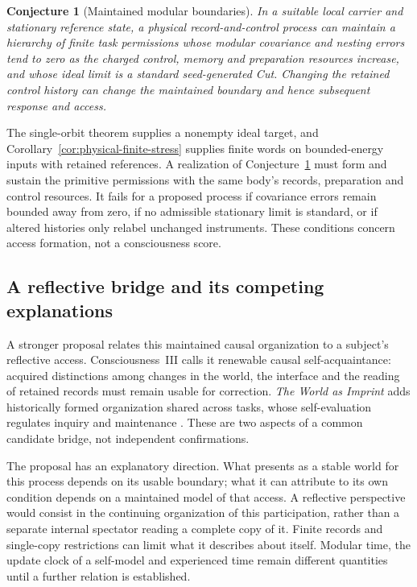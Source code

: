 \documentclass[12pt]{article}
\newtheorem{conjecture}[theorem]{Conjecture}
\theoremstyle{definition}
\theoremstyle{remark}
\newcounter{none}
\begin{document}
\begin{conjecture}[Maintained modular boundaries]\label{conj:maintained}
In a suitable local carrier and stationary reference state, a physical
record-and-control process can maintain a hierarchy of finite task
permissions whose modular covariance and nesting errors tend to zero as the
charged control, memory and preparation resources increase, and whose ideal
limit is a standard seed-generated Cut. Changing the retained control history
can change the maintained boundary and hence subsequent response and access.
\end{conjecture}
The single-orbit theorem supplies a nonempty ideal target, and
Corollary~\ref{cor:physical-finite-stress} supplies finite words on
bounded-energy inputs with retained references. A realization of
Conjecture~\ref{conj:maintained} must form and sustain the primitive
permissions with the same body's records, preparation and control
resources. It fails for a proposed process if covariance errors remain
bounded away from zero, if no admissible stationary limit is standard,
or if altered histories only relabel unchanged instruments. These
conditions concern access formation, not a consciousness score.

\subsection{A reflective bridge and its competing explanations}

A stronger proposal relates this maintained causal organization to a
subject's reflective access. Consciousness~III calls it renewable causal
self-acquaintance: acquired distinctions among changes in the world,
the interface and the reading of retained records must remain usable
for correction. \emph{The World as Imprint} adds historically formed
organization shared across tasks, whose self-evaluation regulates
inquiry and maintenance \cite{PaperCIII,WorldImprint}. These are two
aspects of a common candidate bridge, not independent confirmations.

The proposal has an explanatory direction. What presents as a stable
world for this process depends on its usable boundary; what it can
attribute to its own condition depends on a maintained model of that
access. A reflective perspective would consist in the continuing
organization of this participation, rather than a separate internal
spectator reading a complete copy of it. Finite records and
single-copy restrictions can limit what it describes about itself.
Modular time, the update clock of a self-model and experienced time
remain different quantities until a further relation is established.
\end{document}
